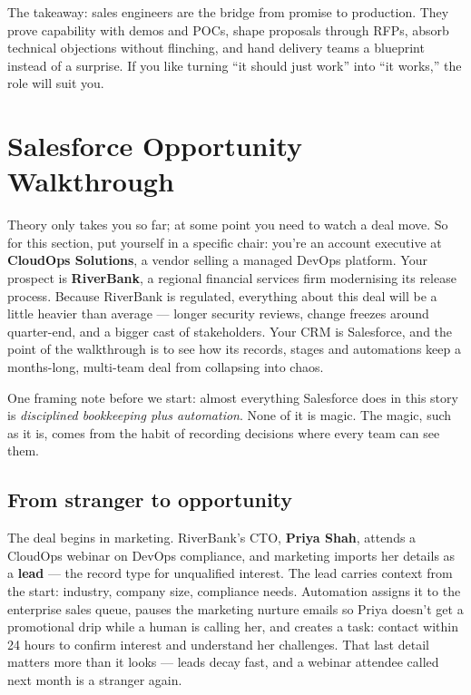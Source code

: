 The takeaway: sales engineers are the bridge from promise to production. They prove capability with demos and POCs, shape proposals through RFPs, absorb technical objections without flinching, and hand delivery teams a blueprint instead of a surprise. If you like turning ``it should just work'' into ``it works,'' the role will suit you.

\section{Salesforce Opportunity Walkthrough}
Theory only takes you so far; at some point you need to watch a deal move. So for this section, put yourself in a specific chair: you're an account executive at \textbf{CloudOps Solutions}, a vendor selling a managed DevOps platform. Your prospect is \textbf{RiverBank}, a regional financial services firm modernising its release process. Because RiverBank is regulated, everything about this deal will be a little heavier than average — longer security reviews, change freezes around quarter-end, and a bigger cast of stakeholders. Your CRM is Salesforce, and the point of the walkthrough is to see how its records, stages and automations keep a months-long, multi-team deal from collapsing into chaos.


One framing note before we start: almost everything Salesforce does in this story is \emph{disciplined bookkeeping plus automation}. None of it is magic. The magic, such as it is, comes from the habit of recording decisions where every team can see them.



\subsection{From stranger to opportunity}


The deal begins in marketing. RiverBank's CTO, \textbf{Priya Shah}, attends a CloudOps webinar on DevOps compliance, and marketing imports her details as a \textbf{lead} — the record type for unqualified interest. The lead carries context from the start: industry, company size, compliance needs. Automation assigns it to the enterprise sales queue, pauses the marketing nurture emails so Priya doesn't get a promotional drip while a human is calling her, and creates a task: contact within 24 hours to confirm interest and understand her challenges. That last detail matters more than it looks — leads decay fast, and a webinar attendee called next month is a stranger again.


